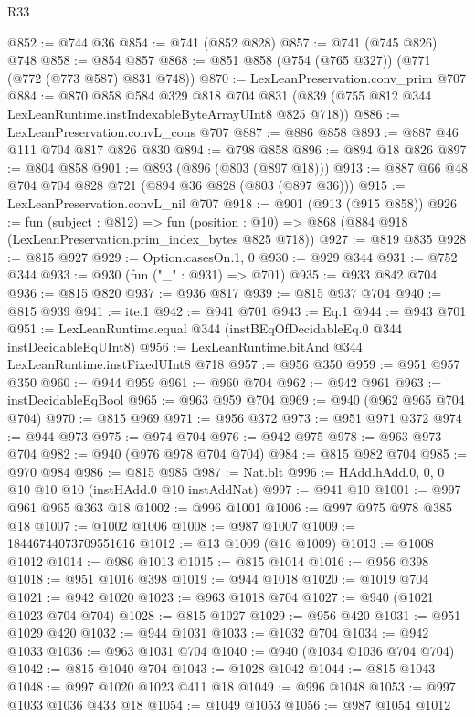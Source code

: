 \begin{lexlean}{R33}
\begin{coremodule}
@852 := @744 @36
@854 := @741 (@852 @828)
@857 := @741 (@745 @826) @748
@858 := @854 @857
@868 := @851 @858 (@754 (@765 @327)) (@771 (@772 (@773 @587) @831 @748))
@870 := LexLeanPreservation.conv_prim @707
@884 := @870
    @858
    @584
    @329
    @818
    @704
    @831
    (@839 (@755 @812 @344 LexLeanRuntime.instIndexableByteArrayUInt8 @825 @718))
@886 := LexLeanPreservation.convL_cons @707
@887 := @886 @858
@893 := @887 @46 @111 @704 @817 @826 @830
@894 := @798 @858
@896 := @894 @18 @826
@897 := @804 @858
@901 := @893 (@896 (@803 (@897 @18)))
@913 := @887 @66 @48 @704 @704 @828 @721 (@894 @36 @828 (@803 (@897 @36)))
@915 := LexLeanPreservation.convL_nil @707
@918 := @901 (@913 (@915 @858))
@926 := fun (subject : @812) =>
  fun (position : @10) => @868 (@884 @918 (LexLeanPreservation.prim_index_bytes @825 @718))
@927 := @819 @835
@928 := @815 @927
@929 := Option.casesOn.{1, 0}
@930 := @929 @344
@931 := @752 @344
@933 := @930 (fun ("_" : @931) => @701)
@935 := @933 @842 @704
@936 := @815 @820
@937 := @936 @817
@939 := @815 @937 @704
@940 := @815 @939
@941 := ite.{1}
@942 := @941 @701
@943 := Eq.{1}
@944 := @943 @701
@951 := LexLeanRuntime.equal @344 (instBEqOfDecidableEq.{0} @344 instDecidableEqUInt8)
@956 := LexLeanRuntime.bitAnd @344 LexLeanRuntime.instFixedUInt8 @718
@957 := @956 @350
@959 := @951 @957 @350
@960 := @944 @959
@961 := @960 @704
@962 := @942 @961
@963 := instDecidableEqBool
@965 := @963 @959 @704
@969 := @940 (@962 @965 @704 @704)
@970 := @815 @969
@971 := @956 @372
@973 := @951 @971 @372
@974 := @944 @973
@975 := @974 @704
@976 := @942 @975
@978 := @963 @973 @704
@982 := @940 (@976 @978 @704 @704)
@984 := @815 @982 @704
@985 := @970 @984
@986 := @815 @985
@987 := Nat.blt
@996 := HAdd.hAdd.{0, 0, 0} @10 @10 @10 (instHAdd.{0} @10 instAddNat)
@997 := @941 @10
@1001 := @997 @961 @965 @363 @18
@1002 := @996 @1001
@1006 := @997 @975 @978 @385 @18
@1007 := @1002 @1006
@1008 := @987 @1007
@1009 := 18446744073709551616
@1012 := @13 @1009 (@16 @1009)
@1013 := @1008 @1012
@1014 := @986 @1013
@1015 := @815 @1014
@1016 := @956 @398
@1018 := @951 @1016 @398
@1019 := @944 @1018
@1020 := @1019 @704
@1021 := @942 @1020
@1023 := @963 @1018 @704
@1027 := @940 (@1021 @1023 @704 @704)
@1028 := @815 @1027
@1029 := @956 @420
@1031 := @951 @1029 @420
@1032 := @944 @1031
@1033 := @1032 @704
@1034 := @942 @1033
@1036 := @963 @1031 @704
@1040 := @940 (@1034 @1036 @704 @704)
@1042 := @815 @1040 @704
@1043 := @1028 @1042
@1044 := @815 @1043
@1048 := @997 @1020 @1023 @411 @18
@1049 := @996 @1048
@1053 := @997 @1033 @1036 @433 @18
@1054 := @1049 @1053
@1056 := @987 @1054 @1012

\end{coremodule}
\end{lexlean}
